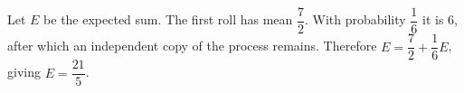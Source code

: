 Let $E$ be the expected sum. The first roll has mean $\dfrac{7}{2}$. With probability $\dfrac{1}{6}$ it is $6$, after which an independent copy of the process remains. Therefore $E=\dfrac{7}{2}+\dfrac{1}{6}E$, giving $\boxed{E=\dfrac{21}{5}}$.
